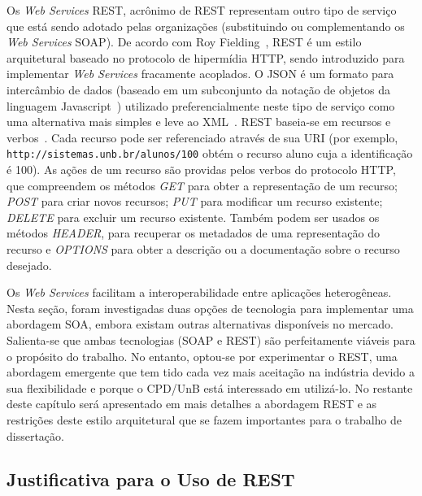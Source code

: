 Os \textit{Web Services} \acrshort{REST}, acrônimo de \acrlong{REST} representam outro tipo de serviço que está sendo adotado pelas organizações (substituindo ou complementando os \textit{Web Services} \acrshort{SOAP}). De acordo com Roy Fielding~\cite{fielding2000architectural}, \acrshort{REST} é um estilo arquitetural baseado no protocolo de hipermídia \acrshort{HTTP}, sendo introduzido para implementar \textit{Web Services} fracamente acoplados. O \acrfull{JSON} é um formato para intercâmbio de dados  (baseado em um subconjunto da notação de objetos da linguagem Javascript~\cite{bray2014javascript}) utilizado preferencialmente neste tipo de serviço como uma alternativa mais simples
e leve ao \acrshort{XML}~\cite{richardson2008restful}.
\acrshort{REST} baseia-se em recursos e verbos~\cite{fielding1999rfc}. Cada recurso pode ser referenciado através de sua \acrshort{URI} (por exemplo, \texttt{http://sistemas.unb.br/alunos/100} obtém o recurso aluno cuja a identificação é 100). As ações de um recurso são providas pelos verbos do protocolo \acrshort{HTTP}, que compreendem os métodos \textit{GET} para obter a representação de um recurso; \textit{POST} para criar novos recursos; \textit{PUT} para modificar um recurso existente; \textit{DELETE} para excluir um recurso existente. Também podem ser usados os m\'{e}todos \textit{HEADER}, para recuperar os metadados de uma representação do recurso e \textit{OPTIONS} para obter a descrição ou a documentação sobre o recurso desejado. 

Os \textit{Web Services} facilitam a interoperabilidade entre aplicações heterogêneas. Nesta seção, foram investigadas duas opções de tecnologia para implementar uma abordagem \acrshort{SOA}, embora existam outras alternativas disponíveis no mercado. Salienta-se que ambas tecnologias (\acrshort{SOAP} e \acrshort{REST}) são perfeitamente viáveis para o propósito do trabalho. No entanto, optou-se por experimentar o \acrshort{REST}, uma abordagem emergente que tem tido cada vez mais aceitação na indústria devido
a sua flexibilidade e porque o CPD/UnB está interessado em utilizá-lo. No restante deste capítulo será apresentado em mais detalhes a abordagem \acrshort{REST} e as restrições deste estilo arquitetural que se fazem importantes para o trabalho de dissertação.




\subsection{Justificativa para o Uso de REST}\label{justificativa_uso_rest}%

